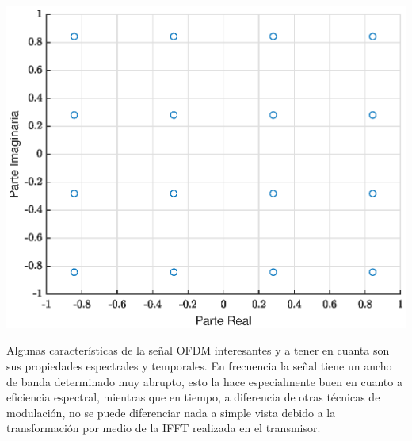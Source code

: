 \documentclass[11pt]{scrartcl} %
\begin{document}
\begin{preview}
\begin{minipage}{\linewidth}
	\label{fig1}
	\begin{center}
		\includegraphics[width=1\columnwidth,trim={0 0 1cm 0},clip]{../../Matlab/Figures/constelacion.eps} %
	\end{center}
\end{minipage}
\newline

Algunas características de la señal OFDM interesantes y a tener en cuanta son sus propiedades espectrales y temporales. En frecuencia la señal tiene un ancho de banda determinado muy abrupto, esto la hace especialmente buen en cuanto a eficiencia espectral, mientras que en tiempo, a diferencia de otras técnicas de modulación, no se puede diferenciar nada a simple vista debido a la transformación por medio de la IFFT realizada en el transmisor.


\end{preview}
\end{document}
